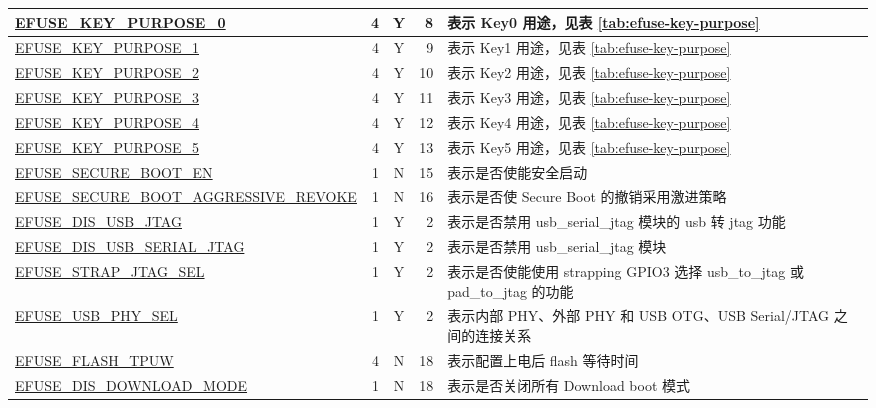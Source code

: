 \begin{longtable}[l]{ |m{8.2cm}|r|c|r|m{9.3cm}| }
    \hline
    \hyperref[fielddesc:EFUSEKEYPURPOSE0]{EFUSE\_KEY\_PURPOSE\_0} & 4 & Y & 8 & 表示 Key0 用途，见表 \ref{tab:efuse-key-purpose} \\
    \hline
    \hyperref[fielddesc:EFUSEKEYPURPOSE1]{EFUSE\_KEY\_PURPOSE\_1} & 4 & Y & 9 & 表示 Key1 用途，见表 \ref{tab:efuse-key-purpose} \\
    \hline
    \hyperref[fielddesc:EFUSEKEYPURPOSE2]{EFUSE\_KEY\_PURPOSE\_2} & 4 & Y & 10 & 表示 Key2 用途，见表 \ref{tab:efuse-key-purpose} \\ 
    \hline
    \hyperref[fielddesc:EFUSEKEYPURPOSE3]{EFUSE\_KEY\_PURPOSE\_3} & 4 & Y & 11 & 表示 Key3 用途，见表 \ref{tab:efuse-key-purpose} \\    
    \hline
    \hyperref[fielddesc:EFUSEKEYPURPOSE4]{EFUSE\_KEY\_PURPOSE\_4} & 4 & Y & 12 & 表示 Key4 用途，见表 \ref{tab:efuse-key-purpose} \\    
    \hline
    \hyperref[fielddesc:EFUSEKEYPURPOSE5]{EFUSE\_KEY\_PURPOSE\_5} & 4 & Y & 13 & 表示 Key5 用途，见表 \ref{tab:efuse-key-purpose} \\  
    \hline
    \hyperref[fielddesc:EFUSESECUREBOOTEN]{EFUSE\_SECURE\_BOOT\_EN} & 1 & N & 15 & 表示是否使能安全启动 \\ 
    \hline
    \hyperref[fielddesc:EFUSESECUREBOOTAGGRESSIVEREVOKE]{EFUSE\_SECURE\_BOOT\_AGGRESSIVE\_REVOKE} & 1 & N & 16 & 表示是否使 Secure Boot 的撤销采用激进策略 \\
    \hline
    \hyperref[fielddesc:EFUSEDISUSBJTAG]{EFUSE\_DIS\_USB\_JTAG} & 1 & Y & 2 & 表示是否禁用 usb\_serial\_jtag 模块的 usb 转 jtag 功能 \\
    \hline
    \hyperref[fielddesc:EFUSEDISUSBSERIALJTAG]{EFUSE\_DIS\_USB\_SERIAL\_JTAG} & 1 & Y & 2 & 表示是否禁用 usb\_serial\_jtag 模块 \\
    \hline
    \hyperref[fielddesc:EFUSESTRAPJTAGSEL]{EFUSE\_STRAP\_JTAG\_SEL} & 1 & Y & 2 & 表示是否使能使用 strapping GPIO3 选择 usb\_to\_jtag 或 pad\_to\_jtag 的功能 \\
    \hline
    \hyperref[fielddesc:EFUSEUSBPHYSEL]{EFUSE\_USB\_PHY\_SEL} & 1 & Y & 2 & 表示内部 PHY、外部 PHY 和 USB OTG、USB Serial/JTAG 之间的连接关系 \\
    \hline
    \hyperref[fielddesc:EFUSEFLASHTPUW]{EFUSE\_FLASH\_TPUW} & 4 & N & 18 & 表示配置上电后 flash 等待时间 \\    
    \hline    
    \hyperref[fielddesc:EFUSEDISDOWNLOADMODE]{EFUSE\_DIS\_DOWNLOAD\_MODE} & 1 & N & 18 & 表示是否关闭所有 Download boot 模式\\       

\end{longtable}
